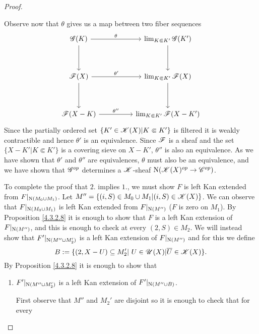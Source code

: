 \documentclass[../../thesis.tex]{subfiles}
\begin{document}
\begin{proof}
\begin{enumerate}
              Observe now that $\theta$ gives us a map between two fiber sequences
              \[\begin{tikzcd}
                      {\G(K)} && {\lim_{K\Subset K'}\G(K')} \\
                      \\
                      {\F(X)} && {\lim_{K\Subset K'}\F(X)} \\
                      \\
                      {\F(X-K)} && {\lim_{K\Subset K'}\F(X-K')}
                      \arrow["\theta", from=1-1, to=1-3]
                      \arrow["{\theta'}", from=3-1, to=3-3]
                      \arrow["{\theta''}", from=5-1, to=5-3]
                      \arrow[from=1-1, to=3-1]
                      \arrow[from=3-1, to=5-1]
                      \arrow[from=1-3, to=3-3]
                      \arrow[from=3-3, to=5-3]
                  \end{tikzcd}\]
              Since the partially ordered set $\{K'\in \mathscr{K}(X) | K\Subset K'\}$ is filtered it is weakly contractible and hence $\theta'$ is an equivalence.
              Since $\mathscr{F}$ is a sheaf and the set $\{X-K' | K \Subset K'\}$ is a covering sieve on $X-K'$, $\theta''$ is also an equivalence.
              As we have shown that $\theta'$ and $\theta''$ are equivalences, $\theta$ must also be an equivalence, and we have shown that $\mathscr{G}^{op}$ determines a $\mathscr{K}$-sheaf $\mathrm{N}(\mathscr{K}(X)^{op} \to \mathscr{C}^{op})$.
    \end{enumerate}
    To complete the proof that $2.$ implies $1.$, we must show $F$ is left Kan extended from $F|_{\mathrm{N}(M_0\cup M_1)}$.
    Let $M''=\{(i,S) \in M_0 \cup M_1 | (i,S)\in \mathscr{K}(X)\}$.
    We can observe that $F|_{\mathrm{N}(M_0 \cup M_1)}$ is left Kan extended from $F|_{\mathrm{N}(M'')}$ ($F$ is zero on $M_1$).
    By Proposition \ref{4.3.2.8} it is enough to show that $F$ is a left Kan extension of $F|_{\mathrm{N}(M'')}$, and this is enough to check at every $(2,S) \in M_2$.
    We will instead show that $F'|_{\mathrm{N}(M'' \cup M_2')}$ is a left Kan extension of $F|_{\mathrm{N}(M'')}$ and for this we define
    \[B:=\{(2, X- U) \subseteq M_2' | U \in \Open(X) | \overline{U} \in \K(X)\} .\]
    By Proposition \ref{4.3.2.8} it is enough to show that
    \begin{enumerate}[label=(\alph*)]
        \item $F'|_{\mathrm{N}(M'' \cup M_2')}$ is a left Kan extension of $F'|_{\mathrm{N}(M'' \cup B)}$.


              First observe that $M''$ and $M_2'$ are disjoint so it is enough to check that for every


\end{enumerate}
\end{proof}
\end{document}
